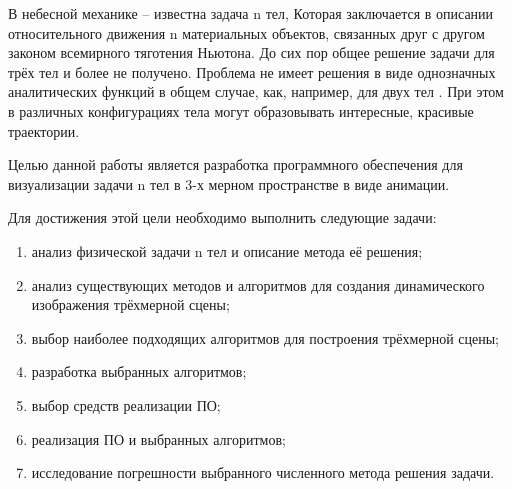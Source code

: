 
В небесной механике – известна задача n тел, Которая заключается в описании относительного движения n материальных объектов, связанных друг с другом законом всемирного тяготения Ньютона. До сих пор общее решение задачи для трёх тел и более не получено.
Проблема не имеет решения в виде однозначных аналитических функций в общем случае, как, например, для двух тел \cite{solution3}. При этом в различных конфигурациях тела могут образовывать интересные, красивые траектории.

Целью данной работы является разработка программного обеспечения для визуализации задачи n тел в 3-х мерном пространстве в виде анимации.

Для достижения этой цели необходимо выполнить следующие задачи:

\begin{enumerate}
	\item анализ физической задачи n тел и описание метода её решения;
	\item анализ существующих методов и алгоритмов для создания динамического изображения трёхмерной сцены;
	\item выбор наиболее подходящих алгоритмов для построения трёхмерной сцены;
	\item разработка выбранных алгоритмов;
	\item выбор средств реализации ПО;
	\item реализация ПО и выбранных алгоритмов;
	\item исследование погрешности выбранного численного метода решения задачи.
\end{enumerate}

\clearpage
